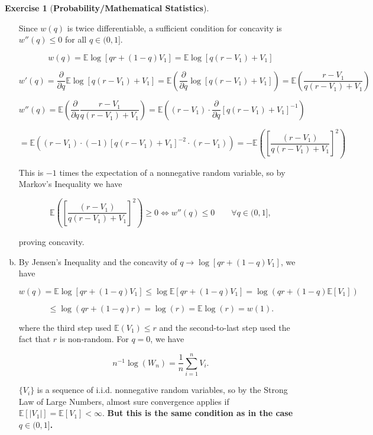 \documentclass{article}
\theoremstyle{definition}
\newtheorem{exercise}{Exercise}
\theoremstyle{definition}
\theoremstyle{definition}
\theoremstyle{definition}
\newcommand{\E}{\mathbb{E}}
\newcommand{\pderiv}[2]{\frac{\partial #1}{\partial #2}}
\begin{document}
\begin{exercise}[\textbf{Probability/Mathematical Statistics}]
\begin{enumerate}[(a)]
Since \(w(q)\) is twice differentiable, a sufficient condition for concavity is \(w''(q) \leq 0 \) for all \(q \in (0,1]\). 

\[
w(q) =  \E \log[qr + (1-q)V_1] =  \E \log[q(r - V_1) + V_1] 
\]

\begin{equation}\label{2016.screen.1.c.deriv}
w'(q) = \pderiv{}{q}  \E \log[q(r - V_1) + V_1]  = \E  \left( \pderiv{}{q} \log[q(r - V_1) + V_1] \right) = \E  \left( \frac{r - V_1}{q(r - V_1) + V_1} \right)
\end{equation}

\[
w''(q) =   \E  \left(   \pderiv{}{q}\frac{r - V_1}{q(r - V_1) + V_1} \right) =   \E  \left( (r - V_1) \cdot   \pderiv{}{q} \left[ q(r - V_1) + V_1 \right]^{-1} \right)
\]

\begin{equation}\label{2016.screen.1.c.2nd.deriv}
 =  \E  \left( (r - V_1) \cdot  (-1) \left[ q(r - V_1) + V_1 \right]^{-2} \cdot (r - V_1) \right) = - \E \left(\left[   \frac{(r - V_1)}{q(r-V_1) + V_1} \right]^2 \right)
\end{equation}

This is \(-1\) times the expectation of a nonnegative random variable, so by Markov's Inequality we have 

\[
\E \left(\left[   \frac{(r - V_1)}{q(r-V_1) + V_1} \right]^2 \right) \geq 0 \iff w''(q) \leq 0 \qquad \forall q \in (0,1],
\]

proving concavity.

\item

By Jensen's Inequality and the concavity of \(q \to \log[qr + (1-q)V_1]\), we have

\[
w(q) =  \E \log[qr + (1-q)V_1] \leq \log \E \left[qr + (1-q)V_1 \right] = \log \left( qr + (1-q) \E[V_1] \right) 
\]

\[
\leq  \log \left( qr + (1-q) r \right) = \log(r) =  \E \log(r ) = w(1).
\]

where the third step used \(\E(V_1) \leq r\) and the second-to-last step used the fact that \(r\) is non-random. For \(q=0\), we have

\[
n^{-1} \log (W_n) = \frac{1}{n} \sum_{i=1}^n V_i .
\]

\( \{V_i \}\) is a sequence of i.i.d. nonnegative random variables, so by the Strong Law of Large Numbers, almost sure convergence applies if \( \E[ \left| V_1 \right|] = \E[V_1]   < \infty \). \textbf{But this is the same condition as in the case \(q \in (0, 1]\).}


\end{enumerate}
\end{exercise}
\end{document}
